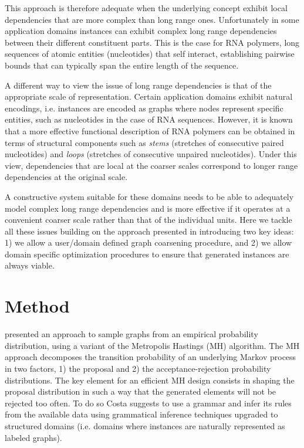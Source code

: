\documentclass{article}
\begin{document}
This approach is therefore adequate when the underlying concept exhibit local
dependencies that are more complex than long range ones.  Unfortunately in
some application domains instances can exhibit complex long range dependencies
between their different constituent parts. This is the case for RNA polymers,
long sequences of atomic entities (nucleotides) that self interact,
establishing pairwise bounds that can typically span the entire length of the
sequence.

A different way to view the issue of long range dependencies is that of the
appropriate scale of representation. Certain application domains exhibit
natural encodings, i.e. instances are encoded as graphs where nodes represent
specific entities, such as nucleotides in the case of RNA sequences. However,
it is known that a more effective functional description of RNA polymers can
be obtained in terms of structural components such as {\em stems} (stretches
of consecutive paired nucleotides) and {\em loops} (stretches of consecutive
unpaired nucleotides). Under this view, dependencies that are local at the
coarser scales correspond to longer range dependencies at the original scale.

A constructive system suitable for these domains needs to be able to
adequately model complex long range dependencies and is more effective if it
operates at a convenient coarser scale rather than that of the individual
units. Here we tackle all these issues building on the approach presented in
\cite{costa16} introducing two key ideas: 1) we allow a user/domain defined graph
coarsening procedure,
and 2) we allow domain specific optimization procedures to ensure that
generated instances are always viable.


\section{Method}

 


\cite{costa16} presented an approach to sample graphs from an empirical
probability distribution, using a variant of the Metropolis Hastings (MH)
algorithm. The MH approach decomposes the transition probability of an
underlying  Markov process in two factors, 1) the proposal  and 2) the
acceptance-rejection probability distributions. The key element for an
efficient MH design consists in shaping the proposal distribution  in such a
way that the generated elements will not be rejected too often. To do so Costa
suggests to use a grammar and infer its rules from the available data using
grammatical inference techniques upgraded to structured domains (i.e. domains
where instances are naturally represented as labeled graphs).
\end{document}
